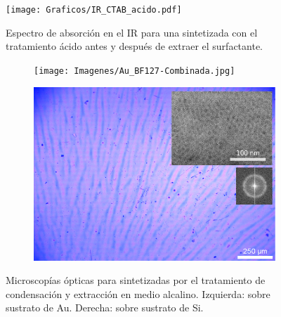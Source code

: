 
    		\begin{figure}[tbh!]
			\begin{center}
			\texttt{[image: Graficos/IR\_CTAB\_acido.pdf]}
			\caption[FTIR \pdmC\space tratamiento ácido.]{Espectro de absorción en el IR para una \pdmC\space sintetizada con el tratamiento ácido antes y después de extraer el surfactante.}
			\label{fig:IR_CTAB_acido}
			\end{center}
			\end{figure}
	
    	

    		\begin{figure}[tbh!]
 	   	    \begin{subfigure}[t]{0.49\textwidth}
	       	\texttt{[image: Imagenes/Au\_BF127-Combinada.jpg]}
	   		\end{subfigure}
	   		\begin{subfigure}[t]{0.49\textwidth}
	   	    \includegraphics[width=\textwidth]{Imagenes/Si_BF127-Combinada.jpg}
	   		\end{subfigure}
			 \caption[Microscopía óptica \pdmF tratamiento en medio alcalino.]{Microscopías ópticas para \pdmF\space sintetizadas por el tratamiento de condensación y extracción en medio alcalino. Izquierda: sobre sustrato de Au. Derecha: sobre sustrato de Si.}
			 \label{fig:Microscopia_F127_basico}	
		     \end{figure}

